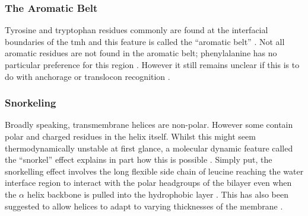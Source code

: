 \subsubsection{The Aromatic Belt}

 Tyrosine and tryptophan residues commonly are found at the interfacial boundaries of the \gls{tmh} and this feature is called the ``aromatic belt'' \cite{Hessa2005, Granseth2005, Sharpe2010, Baeza-Delgado2013, Nilsson2005}. Not all aromatic residues are not found in the aromatic belt; phenylalanine has no particular preference for this region \cite{Granseth2005, Braun1999}. However it still remains unclear if this is to do with anchorage or translocon recognition \cite{Baeza-Delgado2013}.


\subsubsection{Snorkeling}

Broadly speaking, transmembrane helices are non-polar. However some contain polar and  charged residues in the helix itself. Whilst this might seem thermodynamically unstable at first glance, a molecular dynamic feature called the ``snorkel'' effect explains in part how this is possible \cite{Chamberlain2004, Strandberg2003}. Simply put, the snorkelling effect involves the long flexible side chain of leucine reaching the water interface region to interact with the polar headgroups of the bilayer even when the $\alpha$ helix backbone is pulled into the hydrophobic layer \cite{Krishnakumar2007}. This has also been suggested to allow helices to adapt to varying thicknesses of the membrane \cite{Kandasamy2006}.

